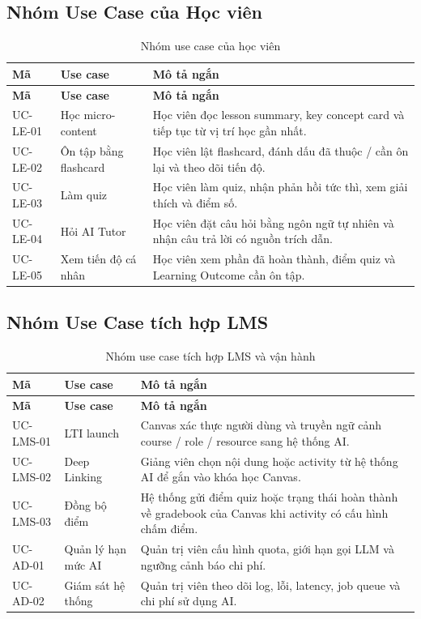 \subsection{Nhóm Use Case của Học viên}
\label{subsec:use-case-hoc-vien}

\begin{longtable}{|p{2.4cm}|p{5.2cm}|p{6.8cm}|}
\caption{Nhóm use case của học viên}
\label{tab:use-case-hoc-vien}\\
\hline
\textbf{Mã} & \textbf{Use case} & \textbf{Mô tả ngắn} \\
\hline
\endfirsthead
\hline
\textbf{Mã} & \textbf{Use case} & \textbf{Mô tả ngắn} \\
\hline
\endhead
UC-LE-01 & Học micro-content & Học viên đọc lesson summary, key concept card và tiếp tục từ vị trí học gần nhất. \\
\hline
UC-LE-02 & Ôn tập bằng flashcard & Học viên lật flashcard, đánh dấu đã thuộc / cần ôn lại và theo dõi tiến độ. \\
\hline
UC-LE-03 & Làm quiz & Học viên làm quiz, nhận phản hồi tức thì, xem giải thích và điểm số. \\
\hline
UC-LE-04 & Hỏi AI Tutor & Học viên đặt câu hỏi bằng ngôn ngữ tự nhiên và nhận câu trả lời có nguồn trích dẫn. \\
\hline
UC-LE-05 & Xem tiến độ cá nhân & Học viên xem phần đã hoàn thành, điểm quiz và Learning Outcome cần ôn tập. \\
\hline
\end{longtable}

\subsection{Nhóm Use Case tích hợp LMS}
\label{subsec:use-case-tich-hop-lms}

\begin{longtable}{|p{2.4cm}|p{5.2cm}|p{6.8cm}|}
\caption{Nhóm use case tích hợp LMS và vận hành}
\label{tab:use-case-lms-van-hanh}\\
\hline
\textbf{Mã} & \textbf{Use case} & \textbf{Mô tả ngắn} \\
\hline
\endfirsthead
\hline
\textbf{Mã} & \textbf{Use case} & \textbf{Mô tả ngắn} \\
\hline
\endhead
UC-LMS-01 & LTI launch & Canvas xác thực người dùng và truyền ngữ cảnh course / role / resource sang hệ thống AI. \\
\hline
UC-LMS-02 & Deep Linking & Giảng viên chọn nội dung hoặc activity từ hệ thống AI để gắn vào khóa học Canvas. \\
\hline
UC-LMS-03 & Đồng bộ điểm & Hệ thống gửi điểm quiz hoặc trạng thái hoàn thành về gradebook của Canvas khi activity có cấu hình chấm điểm. \\
\hline
UC-AD-01 & Quản lý hạn mức AI & Quản trị viên cấu hình quota, giới hạn gọi LLM và ngưỡng cảnh báo chi phí. \\
\hline
UC-AD-02 & Giám sát hệ thống & Quản trị viên theo dõi log, lỗi, latency, job queue và chi phí sử dụng AI. \\
\hline
\end{longtable}

